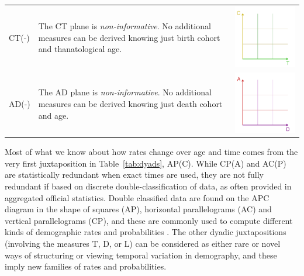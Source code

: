 \documentclass[12pt,oneside,a4paper]{article} %
\theoremstyle{definition}
\begin{document}
\begin{longtable}{m{}L{0.4\textwidth}C{0.2\textwidth}}
  \\
  CT(-) &
  The CT plane is \emph{non-informative}. No additional measures can be derived
  knowing just birth cohort and thanatological age. &
  \includegraphics[scale=.5]{Figures/DiagramTable/CT_rt.pdf} \\
  AD(-) &
  The AD plane is \emph{non-informative}. No additional measures can be derived
  knowing just death cohort and age. &
  \includegraphics[scale=.5]{Figures/DiagramTable/AD_rt.pdf} 
\\
  \bottomrule
\end{longtable}

Most of what we know about how rates change over age and time comes
from the very first juxtaposition in Table~\ref{tab:dyads}, AP(C). While
CP(A) and AC(P) are statistically redundant when exact times are used, they
are not fully redundant if based on discrete double-classification of data, as
often provided in aggregated official statistics. Double classified data are
found on the APC diagram in the shape of squares (AP), horizontal parallelograms
(AC) and vertical parallelograms (CP), and
these are commonly used to compute different kinds of demographic
rates and probabilities \citep[p.~63]{caselli2005demography}. The other dyadic
juxtapositions (involving the measures T, D, or L) can be considered as either
rare or novel ways of structuring or viewing temporal variation in demography,
and these imply new families of rates and probabilities.
\end{document}

